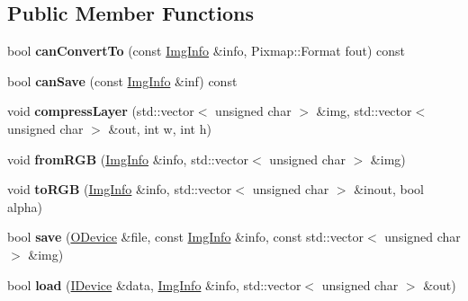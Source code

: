 \subsection*{Public Member Functions}
\begin{DoxyCompactItemize}
\item 
\hypertarget{struct_tempest_1_1_e_t_c_codec_a44cde5bcdf93148bcfddeadd57c4187d}{bool {\bfseries can\+Convert\+To} (const \hyperlink{struct_tempest_1_1_pixmap_1_1_img_info}{Img\+Info} \&info, Pixmap\+::\+Format fout) const }\label{struct_tempest_1_1_e_t_c_codec_a44cde5bcdf93148bcfddeadd57c4187d}

\item 
\hypertarget{struct_tempest_1_1_e_t_c_codec_a8ec533bdff969ff0afa49ea664403cf2}{bool {\bfseries can\+Save} (const \hyperlink{struct_tempest_1_1_pixmap_1_1_img_info}{Img\+Info} \&inf) const }\label{struct_tempest_1_1_e_t_c_codec_a8ec533bdff969ff0afa49ea664403cf2}

\item 
\hypertarget{struct_tempest_1_1_e_t_c_codec_a74adf3da0f09b8e9c2a74489f9f80eb4}{void {\bfseries compress\+Layer} (std\+::vector$<$ unsigned char $>$ \&img, std\+::vector$<$ unsigned char $>$ \&out, int w, int h)}\label{struct_tempest_1_1_e_t_c_codec_a74adf3da0f09b8e9c2a74489f9f80eb4}

\item 
\hypertarget{struct_tempest_1_1_e_t_c_codec_a788246dde3e239ba90bd2c4a4bcfcd87}{void {\bfseries from\+R\+G\+B} (\hyperlink{struct_tempest_1_1_pixmap_1_1_img_info}{Img\+Info} \&info, std\+::vector$<$ unsigned char $>$ \&img)}\label{struct_tempest_1_1_e_t_c_codec_a788246dde3e239ba90bd2c4a4bcfcd87}

\item 
\hypertarget{struct_tempest_1_1_e_t_c_codec_a991d41163b4d1ec924d02173831c7c21}{void {\bfseries to\+R\+G\+B} (\hyperlink{struct_tempest_1_1_pixmap_1_1_img_info}{Img\+Info} \&info, std\+::vector$<$ unsigned char $>$ \&inout, bool alpha)}\label{struct_tempest_1_1_e_t_c_codec_a991d41163b4d1ec924d02173831c7c21}

\item 
\hypertarget{struct_tempest_1_1_e_t_c_codec_a23984f355a74c55ccc1ab5ca16753a70}{bool {\bfseries save} (\hyperlink{class_tempest_1_1_o_device}{O\+Device} \&file, const \hyperlink{struct_tempest_1_1_pixmap_1_1_img_info}{Img\+Info} \&info, const std\+::vector$<$ unsigned char $>$ \&img)}\label{struct_tempest_1_1_e_t_c_codec_a23984f355a74c55ccc1ab5ca16753a70}

\item 
\hypertarget{struct_tempest_1_1_e_t_c_codec_a7d9e449546e9b48e9395e2c0486b97e8}{bool {\bfseries load} (\hyperlink{class_tempest_1_1_i_device}{I\+Device} \&data, \hyperlink{struct_tempest_1_1_pixmap_1_1_img_info}{Img\+Info} \&info, std\+::vector$<$ unsigned char $>$ \&out)}\label{struct_tempest_1_1_e_t_c_codec_a7d9e449546e9b48e9395e2c0486b97e8}

\end{DoxyCompactItemize}
